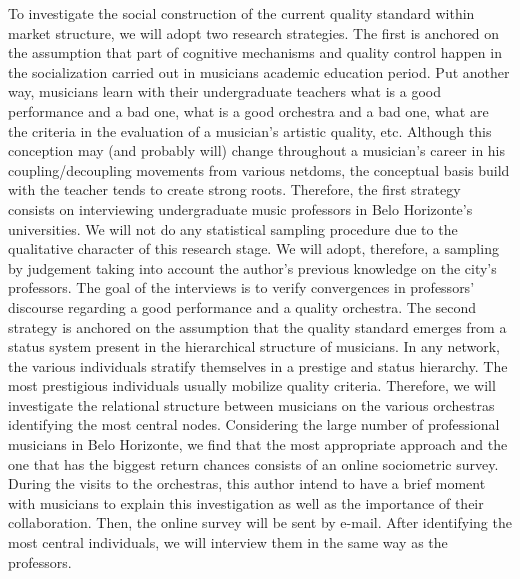 \documentclass[a4paper, 12pt, openright, oneside, german, french, brazil, english, article]{abntex2}
\begin{document}
	To investigate the social construction of the current quality standard within market structure, we will adopt two research strategies. The first is anchored on the assumption that part of cognitive mechanisms and quality control happen in the socialization carried out in musicians academic education period. Put another way, musicians learn with their undergraduate teachers what is a good performance and a bad one, what is a good orchestra and a bad one, what are the criteria in the evaluation of a musician's artistic quality, etc. Although this conception may (and probably will) change throughout a musician's career in his coupling/decoupling movements from various netdoms, the conceptual basis build with the teacher tends to create strong roots. Therefore, the first strategy consists on interviewing undergraduate music professors in Belo Horizonte's universities. We will not do any statistical sampling procedure due to the qualitative character of this research stage. We will adopt, therefore, a sampling by judgement taking into account the author's previous knowledge on the city's professors. The goal of the interviews is to verify convergences in professors' discourse regarding a good performance and a quality orchestra. The second strategy is anchored on the assumption that the quality standard emerges from a status system present in the hierarchical structure of musicians. In any network, the various individuals stratify themselves in a prestige and status hierarchy. The most prestigious individuals usually mobilize quality criteria. Therefore, we will investigate the relational structure between musicians on the various orchestras identifying the most central nodes. Considering the large number of professional musicians in Belo Horizonte, we find that the most appropriate approach and the one that has the biggest return chances consists of an online sociometric survey. During the visits to the orchestras, this author intend to have a brief moment with musicians to explain this investigation as well as the importance of their collaboration. Then, the online survey will be sent by e-mail. After identifying the most central individuals, we will interview them in the same way as the professors.
	
	
\end{document}
